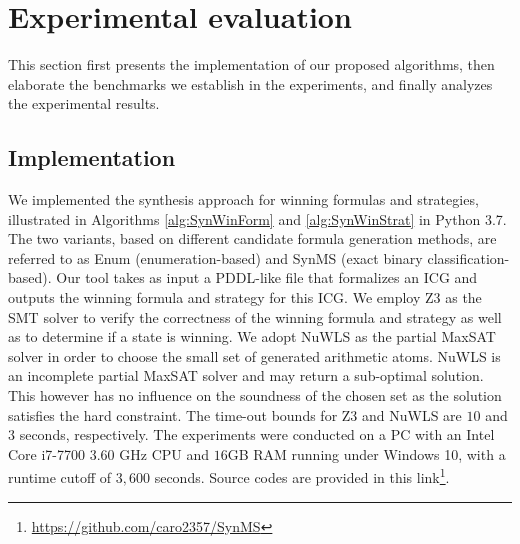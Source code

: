 \documentclass[review]{elsarticle}
\begin{document}
	
\section{Experimental evaluation}
This section first presents the implementation of our proposed algorithms, then elaborate the benchmarks we establish in the experiments, and finally analyzes the experimental results. 


\subsection{Implementation}
We implemented the synthesis approach for winning formulas and strategies, illustrated in Algorithms \ref{alg:SynWinForm} and \ref{alg:SynWinStrat} in Python 3.7.
The two variants, based on different candidate formula generation methods, are referred to as Enum (enumeration-based) and SynMS (exact binary classification-based).
Our tool takes as input a PDDL-like file that formalizes an ICG and outputs the winning formula and strategy for this ICG.
We employ Z3 \cite{MouB2008} as the SMT solver to verify the correctness of the winning formula and strategy as well as to determine if a state is winning.
We adopt NuWLS \cite{ChuCL2023} as the partial MaxSAT solver in order to choose the small set of generated arithmetic atoms.
NuWLS is an incomplete partial MaxSAT solver and may return a sub-optimal solution.
This however has no influence on the soundness of the chosen set as the solution satisfies the hard constraint.
The time-out bounds for Z3 and NuWLS are $10$ and $3$ seconds, respectively.
The experiments were conducted on a PC with an Intel Core i7-7700 $3.60$ GHz CPU and $16$GB RAM running under Windows 10, with a runtime cutoff of $3,600$ seconds.
Source codes are provided in this link\footnote{\url{https://github.com/caro2357/SynMS}}.
\end{document}
